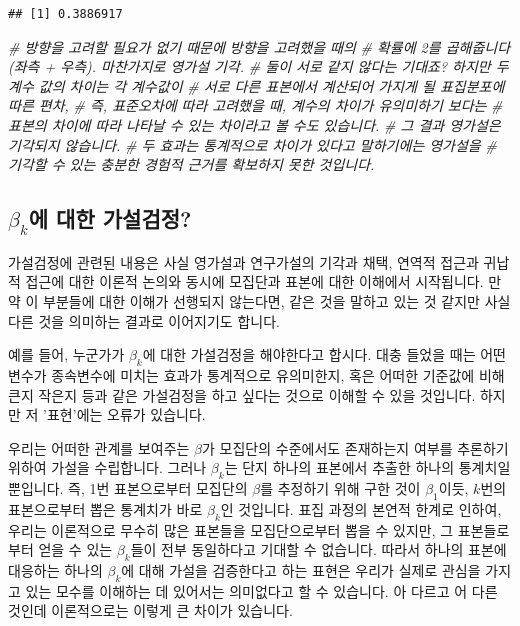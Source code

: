 \documentclass[
]{book}
\newenvironment{Shaded}{\begin{snugshade}}{\end{snugshade}}
\newcommand{\CommentTok}[1]{\textcolor[rgb]{0.56,0.35,0.01}{\textit{#1}}}
\begin{document}
\begin{verbatim}
## [1] 0.3886917
\end{verbatim}

\begin{Shaded}
\begin{Highlighting}[]
\CommentTok{# 방향을 고려할 필요가 없기 때문에 방향을 고려했을 때의 }
\CommentTok{# 확률에 2를 곱해줍니다 (좌측 + 우측). 마찬가지로 영가설 기각.}
\CommentTok{# 둘이 서로 같지 않다는 기대죠? 하지만 두 계수 값의 차이는 각 계수값이}
\CommentTok{# 서로 다른 표본에서 계산되어 가지게 될 표집분포에 따른 편차,}
\CommentTok{# 즉, 표준오차에 따라 고려했을 때, 계수의 차이가 유의미하기 보다는}
\CommentTok{# 표본의 차이에 따라 나타날 수 있는 차이라고 볼 수도 있습니다.}
\CommentTok{# 그 결과 영가설은 기각되지 않습니다. }
\CommentTok{# 두 효과는 통계적으로 차이가 있다고 말하기에는 영가설을 }
\CommentTok{# 기각할 수 있는 충분한 경험적 근거를 확보하지 못한 것입니다.}
\end{Highlighting}
\end{Shaded}

\hypertarget{beta_kuxc5d0-uxb300uxd55c-uxac00uxc124uxac80uxc815}{%
\subsection{\texorpdfstring{\(\beta_k\)에 대한 가설검정?}{\textbackslash beta\_k에 대한 가설검정?}}\label{beta_kuxc5d0-uxb300uxd55c-uxac00uxc124uxac80uxc815}}

가설검정에 관련된 내용은 사실 영가설과 연구가설의 기각과 채택, 연역적 접근과 귀납적 접근에 대한 이론적 논의와 동시에 모집단과 표본에 대한 이해에서 시작됩니다. 만약 이 부분들에 대한 이해가 선행되지 않는다면, 같은 것을 말하고 있는 것 같지만 사실 다른 것을 의미하는 결과로 이어지기도 합니다.

예를 들어, 누군가가 \(\beta_k\)에 대한 가설검정을 해야한다고 합시다. 대충 들었을 때는 어떤 변수가 종속변수에 미치는 효과가 통계적으로 유의미한지, 혹은 어떠한 기준값에 비해 큰지 작은지 등과 같은 가설검정을 하고 싶다는 것으로 이해할 수 있을 것입니다. 하지만 저 '표현'에는 오류가 있습니다.

우리는 어떠한 관계를 보여주는 \(\beta\)가 모집단의 수준에서도 존재하는지 여부를 추론하기 위하여 가설을 수립합니다. 그러나 \(\beta_k\)는 단지 하나의 표본에서 추출한 하나의 통계치일 뿐입니다. 즉, 1번 표본으로부터 모집단의 \(\beta\)를 추정하기 위해 구한 것이 \(\beta_1\)이듯, \(k\)번의 표본으로부터 뽑은 통계치가 바로 \(\beta_k\)인 것입니다. 표집 과정의 본연적 한계로 인하여, 우리는 이론적으로 무수히 많은 표본들을 모집단으로부터 뽑을 수 있지만, 그 표본들로부터 얻을 수 있는 \(\beta_k\)들이 전부 동일하다고 기대할 수 없습니다. 따라서 하나의 표본에 대응하는 하나의 \(\beta_k\)에 대해 가설을 검증한다고 하는 표현은 우리가 실제로 관심을 가지고 있는 모수를 이해하는 데 있어서는 의미없다고 할 수 있습니다. 아 다르고 어 다른 것인데 이론적으로는 이렇게 큰 차이가 있습니다.
\end{document}
